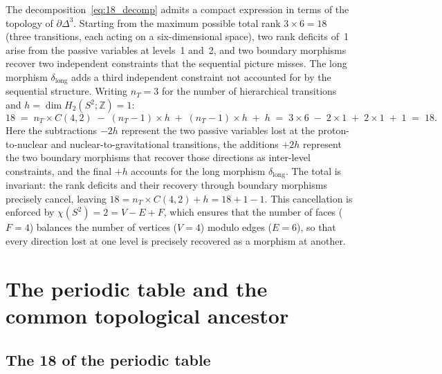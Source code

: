 \documentclass[11pt,a4paper]{article}
\theoremstyle{definition}
\newcommand{\Sfour}{\partial\Delta^3}
\newcommand{\dlong}{\delta_{\mathrm{long}}}
\begin{document}
The decomposition~\eqref{eq:18_decomp} admits a compact expression in terms of the topology of $\Sfour$. Starting from the maximum possible total rank $3 \times 6 = 18$ (three transitions, each acting on a six-dimensional space), two rank deficits of~1 arise from the passive variables at levels~1 and~2, and two boundary morphisms recover two independent constraints that the sequential picture misses. The long morphism $\dlong$ adds a third independent constraint not accounted for by the sequential structure. Writing $n_T = 3$ for the number of hierarchical transitions and $h = \dim H_2(S^2;\mathbb{Z}) = 1$:
\begin{equation}
  \label{eq:euler_count}
  18 \;=\; n_T \times C(4,2) \;-\; (n_T - 1) \times h \;+\; (n_T - 1) \times h \;+\; h
  \;=\; 3 \times 6 \;-\; 2 \times 1 \;+\; 2 \times 1 \;+\; 1 \;=\; 18.
\end{equation}
Here the subtractions $-2h$ represent the two passive variables lost at the proton-to-nuclear and nuclear-to-gravitational transitions, the additions $+2h$ represent the two boundary morphisms that recover those directions as inter-level constraints, and the final $+h$ accounts for the long morphism $\dlong$. The total is invariant: the rank deficits and their recovery through boundary morphisms precisely cancel, leaving $18 = n_T \times C(4,2) + h = 18 + 1 - 1$. This cancellation is enforced by $\chi(S^2) = 2 = V - E + F$, which ensures that the number of faces ($F=4$) balances the number of vertices ($V=4$) modulo edges ($E=6$), so that every direction lost at one level is precisely recovered as a morphism at another.

\section{The periodic table and the common topological ancestor}
\label{sec:periodic}

\subsection{The 18 of the periodic table}
\label{subsec:periodic_18}
\end{document}
